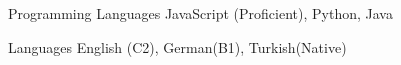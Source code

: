 

\begin{cvskills}

\cvskill
    {Programming Languages} %
    {JavaScript (Proficient), Python, Java} %


  \cvskill
    {Languages} %
    {English (C2), German(B1), Turkish(Native)} %

\end{cvskills}
